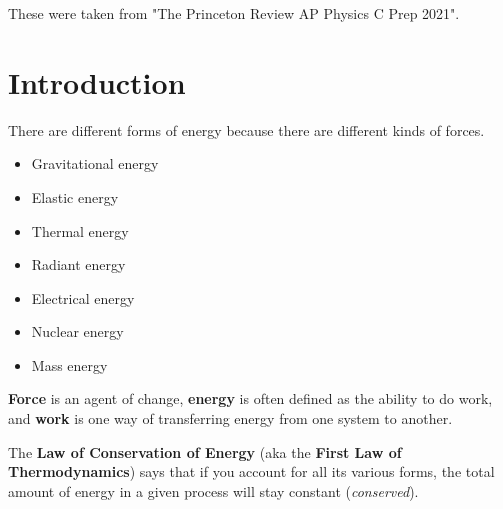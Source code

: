 \documentclass{article}
\begin{document}
\noindent

\begin{note}
    These were taken from "The Princeton Review AP Physics C Prep 2021". 
\end{note}

\section{Introduction}
There are different forms of energy because there are different kinds of forces. 
\begin{itemize}
    \item Gravitational energy
    \item Elastic energy
    \item Thermal energy
    \item Radiant energy
    \item Electrical energy
    \item Nuclear energy
    \item Mass energy
\end{itemize}
\begin{definition}
    \textbf{Force} is an agent of change, \textbf{energy} is often defined as the ability to do work, and \textbf{work} is one way of transferring energy from one system to another.
\end{definition}
The \textbf{Law of Conservation of Energy} (aka the \textbf{First Law of Thermodynamics}) says that if you account for all its various forms, the total amount of energy in a given process will stay constant (\textit{conserved}).
\end{document}
